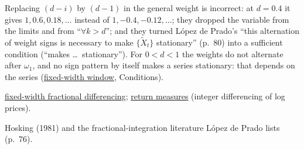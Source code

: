 \begin{qfmodel}
 Replacing $(d-i)$ by $(d-1)$ in the general weight is incorrect: at $d=0.4$ it gives $1,0.6,0.18,\dots$ instead of $1,-0.4,-0.12,\dots$; they dropped the variable from the limits and from ``$\forall k>d$''; and they turned López de Prado's ``this alternation of weight signs is necessary to make $\{\tilde X_t\}$ stationary'' (p.~80) into a sufficient condition (``makes \dots\ stationary''). For $0<d<1$ the weights do not alternate after $\omega_1$, and no sign pattern by itself makes a series stationary: that depends on the series (\hyperref[meth:fixed-width-fractional-differencing]{fixed-width window}, Conditions).

 \hyperref[meth:fixed-width-fractional-differencing]{fixed-width fractional differencing}; \hyperref[def:return-measures]{return measures} (integer differencing of log prices).

 Hosking (1981) and the fractional-integration literature López de Prado lists (p.~76).

\end{qfmodel}

